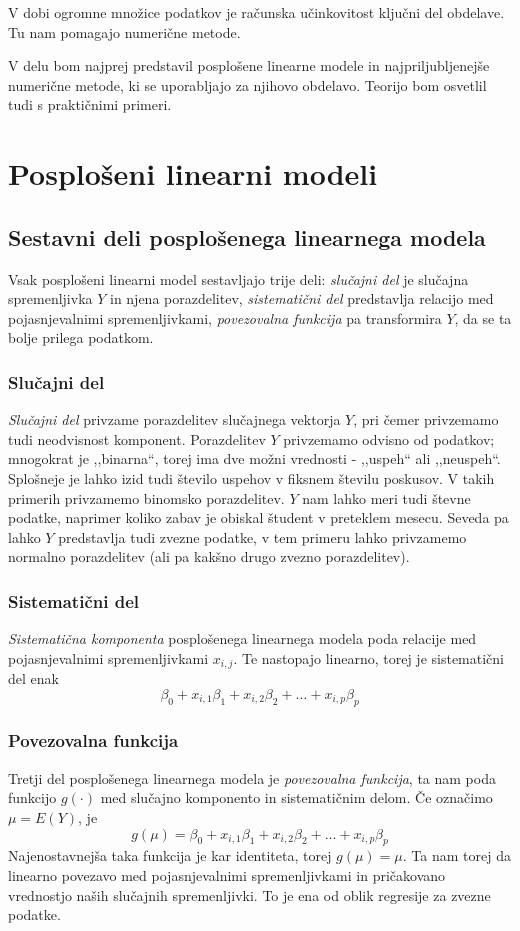 \documentclass[12pt,a4paper]{amsart}
\theoremstyle{definition} %
\theoremstyle{plain} %
\begin{document}
V dobi ogromne množice podatkov je računska učinkovitost ključni del obdelave. Tu nam pomagajo numerične metode.

V delu bom najprej predstavil posplošene linearne modele in najpriljubljenejše numerične metode, ki se uporabljajo za njihovo obdelavo. 
Teorijo bom osvetlil tudi s praktičnimi primeri.

\section{Posplošeni linearni modeli}

\subsection{Sestavni deli posplošenega linearnega modela}
Vsak posplošeni linearni model sestavljajo trije deli: \textit{slučajni del} je slučajna spremenljivka $Y$ in njena porazdelitev, 
\textit{sistematični del} predstavlja relacijo med pojasnjevalnimi spremenljivkami, \textit{povezovalna funkcija} pa transformira $Y$, da se ta
bolje prilega podatkom.

\subsubsection{Slučajni del}
\textit{Slučajni del} privzame porazdelitev slučajnega vektorja $Y$, pri čemer privzemamo tudi neodvisnost komponent. Porazdelitev $Y$
privzemamo odvisno od podatkov; mnogokrat je ,,binarna``, torej ima dve možni vrednosti - ,,uspeh`` ali ,,neuspeh``. Splošneje je lahko izid tudi 
število uspehov v fiksnem številu poskusov. V takih primerih privzamemo binomsko porazdelitev. $Y$ nam lahko meri tudi števne podatke, naprimer 
koliko zabav je obiskal študent v preteklem mesecu. Seveda pa lahko $Y$ predstavlja tudi zvezne podatke,
v tem primeru lahko privzamemo normalno porazdelitev (ali pa kakšno drugo zvezno porazdelitev).

\subsubsection{Sistematični del} 
\textit{Sistematična komponenta} posplošenega linearnega modela poda relacije med pojasnjevalnimi spremenljivkami $x_{i,j}$. Te nastopajo 
linearno, torej je sistematični del enak
\[
\beta_{0} + x_{i,1}\beta_{1} + x_{i,2}\beta_{2} + \ldots + x_{i,p}\beta_{p}
\]


\subsubsection{Povezovalna funkcija}
Tretji del posplošenega linearnega modela je \textit{povezovalna funkcija}, ta nam poda funkcijo $g(\cdot)$ med slučajno komponento
in sistematičnim delom. Če označimo $\mu = E(Y)$, je
\[
    g(\mu) = \beta_{0} + x_{i,1}\beta_{1} + x_{i,2}\beta_{2} + \ldots + x_{i,p}\beta_{p}
\]
Najenostavnejša taka funkcija je kar identiteta, torej $g(\mu) = \mu$. Ta nam torej da linearno povezavo med pojasnjevalnimi spremenljivkami 
in pričakovano vrednostjo naših slučajnih spremenljivki. To je ena od oblik regresije za zvezne podatke.
\end{document}
